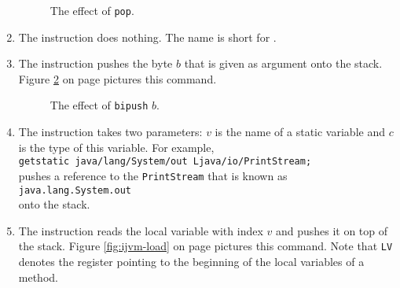\begin{enumerate}
\begin{figure}[!ht]
{\begin{picture}
\end{picture}}
  \caption{The effect of \texttt{pop}.}
  \label{fig:ijvm-pop}
\end{figure}

\item The instruction 
      does nothing.  The name is short for .
\item The instruction 
      pushes the byte $b$ that is given as argument onto the stack.
      Figure \ref{fig:ijvm-bipush} on page \pageref{fig:ijvm-bipush} pictures this command.

\setlength{\unitlength}{0.5cm}
\begin{figure}[!ht]
  \centering
{}
  \caption{The effect of \texttt{bipush} $b$.}
  \label{fig:ijvm-bipush}
\end{figure}
 

\item The instruction 
      takes two parameters:  $v$ is the name of a static variable and $c$ is the type of this variable.
      For example,  
      \\[0.2cm]
      \hspace*{1.3cm}
      \texttt{getstatic java/lang/System/out Ljava/io/PrintStream;}
      \\[0.2cm] 
      pushes a reference to the \texttt{PrintStream} that is known as 
      \\[0.2cm]
      \hspace*{1.3cm}
      \texttt{java.lang.System.out}
      \\[0.2cm]
      onto the stack.
\item The instruction 
      reads the local variable with index  $v$ and pushes it on top of the stack.
      Figure \ref{fig:ijvm-load} on page \pageref{fig:ijvm-load} pictures this command.
      Note that \texttt{LV} denotes the register pointing to the beginning of the local variables of a
      method. 


\end{enumerate}
